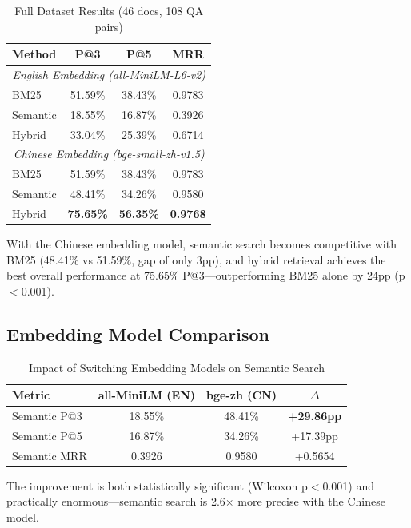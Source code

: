 ﻿\documentclass[11pt,a4paper]{article}
\begin{document}
\begin{table}[h]
\centering
\caption{Full Dataset Results (46 docs, 108 QA pairs)}
\begin{tabular}{lccc}
\toprule
\textbf{Method} & \textbf{P@3} & \textbf{P@5} & \textbf{MRR} \\
\midrule
\multicolumn{4}{c}{\textit{English Embedding (all-MiniLM-L6-v2)}} \\
\midrule
BM25       & 51.59\% & 38.43\% & 0.9783 \\
Semantic   & 18.55\% & 16.87\% & 0.3926 \\
Hybrid     & 33.04\% & 25.39\% & 0.6714 \\
\midrule
\multicolumn{4}{c}{\textit{Chinese Embedding (bge-small-zh-v1.5)}} \\
\midrule
BM25       & 51.59\% & 38.43\% & 0.9783 \\
Semantic   & 48.41\% & 34.26\% & 0.9580 \\
Hybrid     & \textbf{75.65\%} & \textbf{56.35\%} & \textbf{0.9768} \\
\bottomrule
\end{tabular}
\end{table}

With the Chinese embedding model, semantic search becomes competitive with BM25 (48.41\% vs 51.59\%, gap of only 3pp), and hybrid retrieval achieves the best overall performance at 75.65\% P@3---outperforming BM25 alone by 24pp (p$<$0.001).

\subsection{Embedding Model Comparison}

\begin{table}[h]
\centering
\caption{Impact of Switching Embedding Models on Semantic Search}
\begin{tabular}{lccc}
\toprule
\textbf{Metric} & \textbf{all-MiniLM (EN)} & \textbf{bge-zh (CN)} & $\Delta$ \\
\midrule
Semantic P@3 & 18.55\% & 48.41\% & \textbf{+29.86pp} \\
Semantic P@5 & 16.87\% & 34.26\% & +17.39pp \\
Semantic MRR & 0.3926  & 0.9580  & +0.5654 \\
\bottomrule
\end{tabular}
\end{table}

The improvement is both statistically significant (Wilcoxon p$<$0.001) and practically enormous---semantic search is 2.6$\times$ more precise with the Chinese model.
\end{document}
